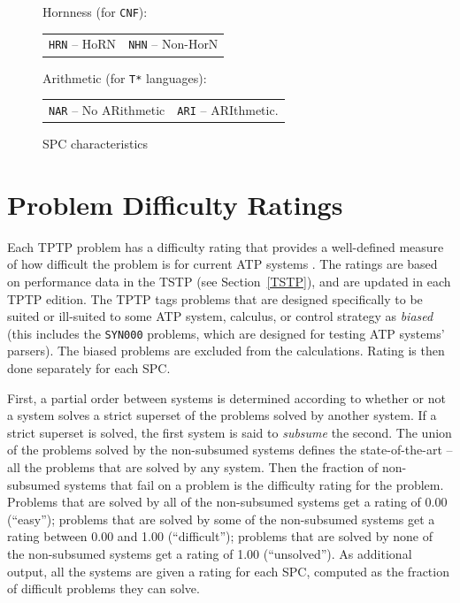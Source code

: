 \documentclass{easychair}
\newenvironment{packed_itemize}{
\vspace*{-0.2em}
\begin{itemize}
\setlength{\partopsep}{0pt}
\setlength{\itemsep}{1pt}
\setlength{\parskip}{0pt}
\setlength{\parsep}{0pt}
}{\end{itemize}}
\begin{document}
\begin{figure}[bht]
\begin{packed_itemize}
\item Hornness (for {\tt CNF}): \\
      \begin{tabular}{@{}p{5cm}l}
      {\tt HRN} -- HoRN &
      {\tt NHN} -- Non-HorN
      \end{tabular}
\item Arithmetic (for {\tt T*} languages): \\
      \begin{tabular}{@{}p{5cm}l}
      {\tt NAR} -- No ARithmetic &
      {\tt ARI} -- ARIthmetic.
      \end{tabular}
\end{packed_itemize}
\caption{SPC characteristics}
\label{SPCCharacteristics}
\end{figure} 

\section{Problem Difficulty Ratings}
\label{Ratings}

Each TPTP problem has a difficulty rating that provides a well-defined measure of how difficult 
the problem is for current ATP systems \cite{SS01}.
The ratings are based on performance data in the TSTP (see Section~\ref{TSTP}), and are updated
in each TPTP edition.
The TPTP tags problems that are designed specifically to be suited or ill-suited to some ATP
system, calculus, or control strategy as {\em biased}
(this includes the {\tt SYN000} problems, which are designed for testing ATP systems' parsers).
The biased problems are excluded from the calculations.
Rating is then done separately for each SPC.

First, a partial order between systems is determined according to whether or not a system 
solves a strict superset of the problems solved by another system. 
If a strict superset is solved, the first system is said to {\em subsume} the second. 
The union of the problems solved by the non-subsumed systems defines the state-of-the-art -- all 
the problems that are solved by any system. 
Then the fraction of non-subsumed systems that fail on a problem is the difficulty rating 
for the problem. 
Problems that are solved by all of the non-subsumed systems get a rating of 0.00 (``easy'');
problems that are solved by some of the non-subsumed systems get a rating between 
0.00 and 1.00 (``difficult''); 
problems that are solved by none of the non-subsumed systems get a rating of 1.00 (``unsolved'').
As additional output, all the systems are given a rating for each SPC, computed as the
fraction of difficult problems they can solve.
\end{document}
